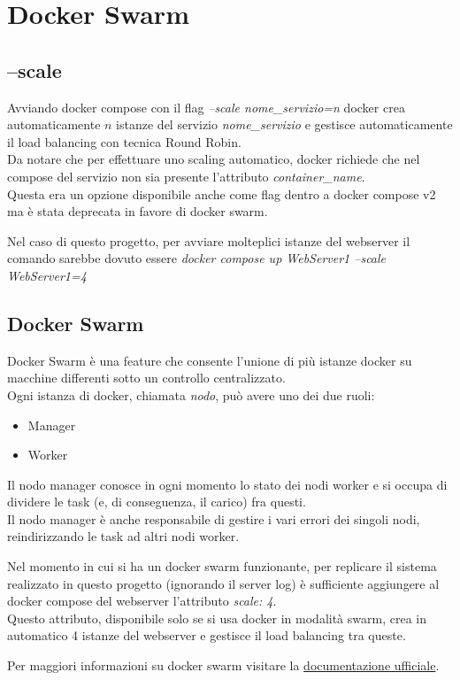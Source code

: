 \documentclass[../DocumentazioneProgetto.tex]{subfiles}
\begin{document}
	\section{Docker Swarm}
	\label{sec:DockerSwarm}
	\subsection{--scale} 
	Avviando docker compose con il flag \textit{--scale nome\_servizio=n} docker crea automaticamente \(n\) istanze del servizio \textit{nome\_servizio} e gestisce automaticamente il load balancing con tecnica Round Robin.\\
	Da notare che per effettuare uno scaling automatico, docker richiede che nel compose del servizio non sia presente l'attributo \textit{container\_name}.\\ 
	Questa era un opzione disponibile anche come flag dentro a docker compose v2 ma è stata deprecata in favore di docker swarm. 

	Nel caso di questo progetto, per avviare molteplici istanze del webserver il comando sarebbe dovuto essere \textit{docker compose up WebServer1 --scale WebServer1=4} 
	\subsection{Docker Swarm} 
	Docker Swarm è una feature che consente l'unione di più istanze docker su macchine differenti sotto un controllo centralizzato.\\
	Ogni istanza di docker, chiamata \textit{nodo}, può avere uno dei due ruoli: 
	\begin{itemize}
		\item Manager
		\item Worker
	\end{itemize}
	Il nodo manager conosce in ogni momento lo stato dei nodi worker e si occupa di dividere le task (e, di conseguenza, il carico) fra questi.\\
	Il nodo manager è anche responsabile di gestire i vari errori dei singoli nodi, reindirizzando le task ad altri nodi worker.

	Nel momento in cui si ha un docker swarm funzionante, per replicare il sistema realizzato in questo progetto (ignorando il server log) è sufficiente aggiungere al docker compose del webserver l'attributo \textit{scale: 4}.\\
	Questo attributo, disponibile solo se si usa docker in modalità swarm, crea in automatico 4 istanze del webserver e gestisce il load balancing tra queste.
	
	Per maggiori informazioni su docker swarm visitare la \href{https://docs.docker.com/engine/swarm/}{documentazione ufficiale}.
\end{document}
